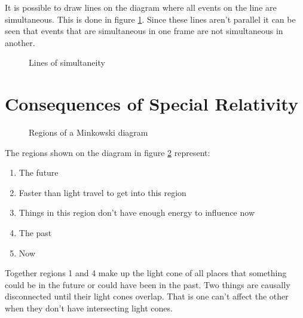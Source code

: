 \documentclass{article}
\begin{document}
    It is possible to draw lines on the diagram where all events on the line are simultaneous. 
    This is done in figure \ref{fig:lines of simultaneity}. 
    Since these lines aren't parallel it can be seen that events that are simultaneous in one frame are not simultaneous in another.
    \begin{figure}[ht]
        \centering
        \caption{Lines of simultaneity}
        \label{fig:lines of simultaneity}
    \end{figure}
    
    \section{Consequences of Special Relativity}
    \begin{figure}[ht]
        \centering
        \caption{Regions of a Minkowski diagram}
        \label{fig:regions of a minkowski diagram}
    \end{figure}
    The regions shown on the diagram in figure \ref{fig:regions of a minkowski diagram} represent:
    \begin{enumerate}
        \item The future
        \item Faster than light travel to get into this region
        \item Things in this region don't have enough energy to influence now
        \item The past
        \item Now
    \end{enumerate}
    Together regions 1 and 4 make up the light cone of all places that something could be in the future or could have been in the past.
    Two things are causally disconnected until their light cones overlap.
    That is one can't affect the other when they don't have intersecting light cones.
    
\end{document}
